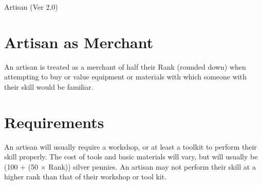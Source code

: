 \begin{Chapter}{Artisan (Ver 2.0)}
\section{Artisan as Merchant}

An artisan is treated as a merchant of half their Rank (rounded down)
when attempting to buy or value equipment or materials with which
someone with their skill would be familiar.

\section{Requirements}
An artisan will usually require a workshop, or at least a toolkit to
perform their skill properly.  The cost of tools and basic materials
will vary, but will usually be (100 + (50 × Rank)) silver pennies. An
artisan may not perform their skill at a higher rank than that of
their workshop or tool kit.

\end{Chapter}
